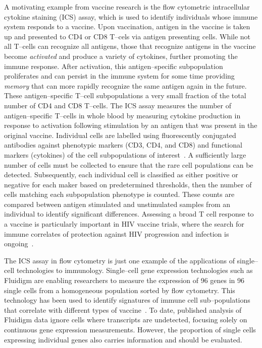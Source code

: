 \documentclass[11pt]{article}
\begin{document}
A motivating example from vaccine research is the flow cytometric intracellular cytokine staining (ICS) assay, which is used to identify individuals whose immune system responds to a vaccine. Upon vaccination, antigen in the vaccine is taken up and presented to CD4 or CD8 T--cels via antigen presenting cells. While not all T--cells can recognize all antigens, those that recognize antigens in the vaccine become \emph{activated} and produce a variety of cytokines, further promoting the immune response. After activation, this antigen--specific subpopulation proliferates and can persist in the immune system for some time providing \emph{memory} that can more rapidly recognize the same antigen again in the future\cite{McKinstry:2010ei}. These antigen--specific T--cell subpopulations a very small fraction of the total number of CD4 and CD8 T--cells. The ICS assay measures the number of antigen--specific T--cells in whole blood by measuring cytokine production in response to activation following stimulation by an antigen that was present in the original vaccine. Individual cells are labelled using fluorescently conjugated antibodies against phenotypic markers (CD3, CD4, and CD8) and functional markers (cytokines) of the cell subpopulations of interest~\cite{Horton:2007tsa,DeRosa:2004wp,Betts:2006dw}. A sufficiently large number of cells must be collected to ensure that the rare cell populations can be detected. Subsequently, each individual cell is classified as either positive or negative for each maker based on predetermined thresholds, then the number of cells matching each subpopulation phenotype is counted. These counts are compared between antigen stimulated and unstimulated samples from an individual to identify significant differences. Assessing a broad T cell response to a vaccine is particularly important in HIV vaccine trials, where the search for immune correlates of protection against HIV progression and infection is ongoing~\cite{Plotkin:2010ve,Horton:2007tsa,Kim:2010fw, Bendall:2011wf}.

The ICS assay in flow cytometry is just one example of the applications of single--cell technologies to immunology. Single--cell gene expression technologies such as Fluidigm are enabling researchers to measure the expression of 96 genes in 96 single cells from a homogeneous population sorted by flow cytometry\cite{Jang:2011uj}. This technology has been used to identify signatures of immune cell sub--populations that correlate with different types of vaccine~\cite{Flatz:2011jb}. To date, published analysis of Fluidigm data ignore cells where transcripts are undetected, focusing solely on continuous gene expression measurements. However, the proportion of single cells expressing individual genes also carries information and should be evaluated.
\end{document}
